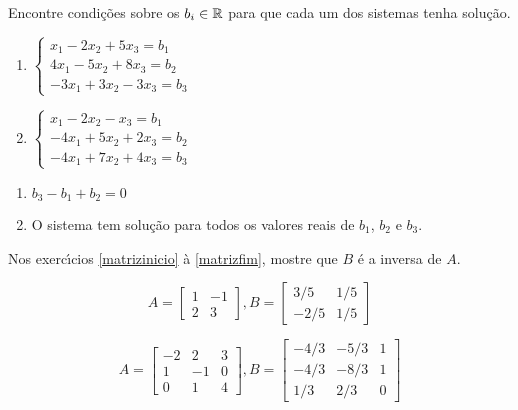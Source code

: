\documentclass[12pt]{exam}
\begin{document}
\begin{exercicio}
  Encontre condi\c{c}\~oes sobre os $b_i \in \mathbb{R}$ para que cada um dos sistemas tenha solu\c{c}\~ao.
  \begin{enumerate}[label={\alph*})]
    \item $\begin{cases}
      x_1 - 2x_2 + 5x_3 = b_1\\
      4x_1 - 5x_2 + 8x_3 = b_2\\
      -3x_1 + 3x_2 - 3x_3 = b_3
    \end{cases}$

    \item $\begin{cases}
      x_1 - 2x_2 - x_3 = b_1\\
      -4x_1 + 5x_2 + 2x_3 = b_2\\
      -4x_1 + 7x_2 + 4x_3 = b_3
    \end{cases}$
  \end{enumerate}
  \begin{solucao}
    \begin{enumerate}[label={\alph*})]
      \item $b_3 - b_1 + b_2 = 0$
      \item O sistema tem solu\c{c}\~ao para todos os valores reais de $b_1$, $b_2$ e $b_3$.
    \end{enumerate}
  \end{solucao}
\end{exercicio}

Nos exerc{\'\i}cios \ref{matrizinicio} \`a \ref{matrizfim}, mostre que $B$ \'e a inversa de $A$.
\begin{exercicio}\label{matrizinicio}
  \[
    A =\begin{bmatrix}
      1 & -1\\
      2 & 3
    \end{bmatrix}, B =\begin{bmatrix}
      3/5 & 1/5\\
      -2/5 & 1/5
    \end{bmatrix}
  \]
\end{exercicio}

\begin{exercicio}
  \[
    A =\begin{bmatrix}
      -2 & 2 & 3\\
      1 & -1 & 0\\
      0 & 1 & 4
    \end{bmatrix}, B =\begin{bmatrix}
      -4/3 & -5/3 & 1\\
      -4/3 & -8/3 & 1\\
      1/3 & 2/3 & 0
    \end{bmatrix}
  \]
\end{exercicio}
\end{document}
